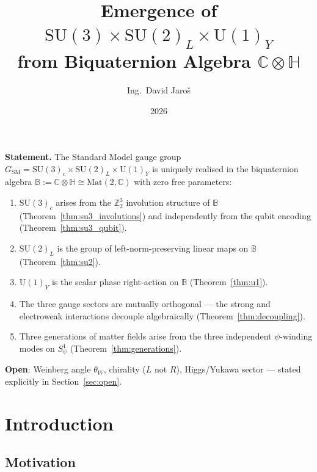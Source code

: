 \documentclass[12pt,a4paper]{article}
\title{\textbf{Emergence of $\mathrm{SU}(3)\times\mathrm{SU}(2)_L\times\mathrm{U}(1)_Y$\\
       from Biquaternion Algebra $\mathbb{C}\otimes\mathbb{H}$}}
\author{Ing.\ David Jaroš}
\date{2026}
\theoremstyle{definition}
\theoremstyle{remark}
\newcommand{\SU}[1]{\mathrm{SU}(#1)}
\newcommand{\UU}[1]{\mathrm{U}(#1)}
\newcommand{\Bq}{\mathbb{C}\otimes\mathbb{H}}
\begin{document}
\maketitle


\begin{tcolorbox}[enhanced,colback=blue!4!white,colframe=blue!55!black,
  arc=3pt,boxrule=1.2pt,
  title={\textbf{\large Main Theorem (Gauge Structure)}}]
\textbf{Statement.}
The Standard Model gauge group
$G_{\mathrm{SM}} = \SU{3}_c\times\SU{2}_L\times\UU{1}_Y$
is uniquely realised in the biquaternion algebra
$\mathbb{B} := \Bq\cong\mathrm{Mat}(2,\mathbb{C})$
with zero free parameters:
\begin{enumerate}[label=\textbf{(\arabic*)}]
  \item $\SU{3}_c$ arises from the $\mathbb{Z}_2^3$ involution structure of
        $\mathbb{B}$ (Theorem~\ref{thm:su3_involutions}) and independently
        from the qubit encoding (Theorem~\ref{thm:su3_qubit}).
  \item $\SU{2}_L$ is the group of left-norm-preserving linear maps on
        $\mathbb{B}$ (Theorem~\ref{thm:su2}).
  \item $\UU{1}_Y$ is the scalar phase right-action on $\mathbb{B}$
        (Theorem~\ref{thm:u1}).
  \item The three gauge sectors are mutually orthogonal — the strong and
        electroweak interactions decouple algebraically
        (Theorem~\ref{thm:decoupling}).
  \item Three generations of matter fields arise from the three
        independent $\psi$-winding modes on $S^1_\psi$
        (Theorem~\ref{thm:generations}).
\end{enumerate}
\textbf{Open}: Weinberg angle $\theta_W$, chirality ($L$ not $R$), Higgs/Yukawa
sector — stated explicitly in Section~\ref{sec:open}.
\end{tcolorbox}

\tableofcontents

\section{Introduction}
\label{sec:intro}

\subsection{Motivation}
\end{document}
